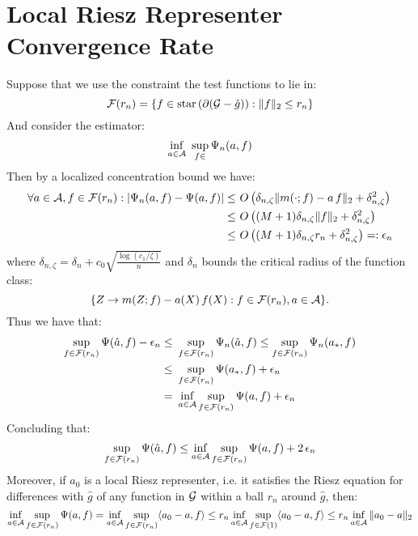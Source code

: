 \section{Local Riesz Representer Convergence Rate}\label{sec:local_RR}

Suppose that we use the constraint the test functions to lie in:
\begin{equation}
    {\mathcal F}(r_n) = \{f \in \text{star}\left(\partial({\mathcal G} - \hat{g})\right): \|f\|_2\leq r_n \}
\end{equation}
And consider the estimator:
\begin{equation}
    \inf_{a \in {\mathcal A}}\,\, \sup_{f \in } \Psi_n(a, f)
\end{equation}
Then by a localized concentration bound we have:
\begin{align}
    \forall a\in {\mathcal A}, f\in {\mathcal F}(r_n): \left| \Psi_n(a, f) - \Psi(a, f) \right| \leq~& O\left(\delta_{n,\zeta} \|m(\cdot; f) - a\, f\|_2 + \delta_{n,\zeta}^2 \right)\\
    \leq~& O\left((M+1)\delta_{n,\zeta} \|f\|_2 + \delta_{n,\zeta}^2\right) \\
    \leq~& O\left((M+1)\delta_{n,\zeta} r_n + \delta_{n,\zeta}^2\right) =: \epsilon_{n}
\end{align}
where $\delta_{n,\zeta}=\delta_n + c_0\sqrt{\frac{\log(c_1/\zeta)}{n}}$ and $\delta_n$ bounds the critical radius of the function class:
\[
\{Z \to m(Z; f) - a(X)\, f(X): f\in {\mathcal F}(r_n), a\in {\mathcal A}\}.
\]
Thus we have that:
\begin{align}
   \sup_{f \in {\mathcal F}(r_n)} \Psi(\hat{a}, f) - \epsilon_n \leq~& \sup_{f \in{\mathcal F}(r_n)} \Psi_n(\hat{a}, f) \leq \sup_{f \in {\mathcal F}(r_n)} \Psi_n(a_*, f) \\
   \leq~& \sup_{f \in {\mathcal F}(r_n)} \Psi(a_*, f) + \epsilon_n\\
    =~& \inf_{a \in {\mathcal A}} \sup_{f \in {\mathcal F}(r_n)} \Psi(a, f) + \epsilon_n
\end{align}
Concluding that:
\begin{equation}
    \sup_{f \in {\mathcal F}(r_n)} \Psi(\hat{a}, f) \leq \inf_{a \in {\mathcal A}} \sup_{f \in {\mathcal F}(r_n)} \Psi(a, f) + 2\,\epsilon_n
\end{equation}
Moreover, if $a_0$ is a local Riesz representer, i.e. it satisfies the Riesz equation for differences with $\hat{g}$ of any function in ${\mathcal G}$ within a ball $r_n$ around $\hat{g}$, then:
\begin{equation}
    \inf_{a \in {\mathcal A}} \sup_{f \in {\mathcal F}(r_n)} \Psi(a, f)  = \inf_{a \in {\mathcal A}} \sup_{f \in {\mathcal F}(r_n)} \langle a_0 - a, f \rangle \leq r_n \inf_{a \in {\mathcal A}} \sup_{f\in {\mathcal F}(1)}  \langle a_0 - a, f \rangle \leq r_n \inf_{a\in {\mathcal A}} \|a_0 - a\|_2
\end{equation}

